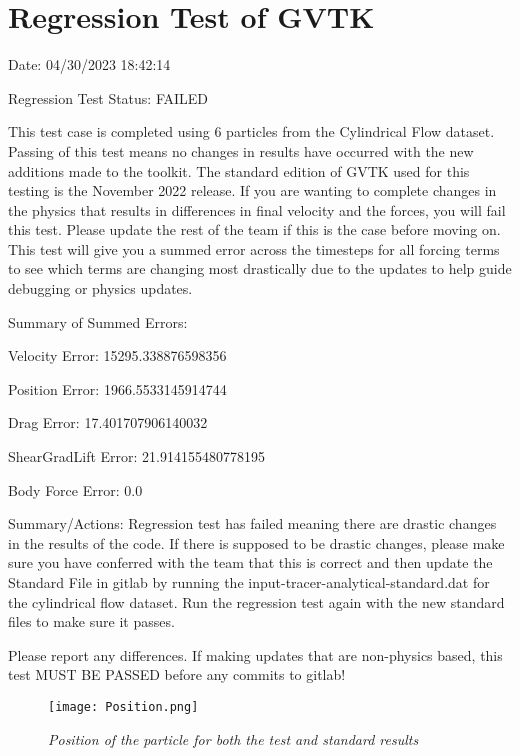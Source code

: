 \documentclass{article}
\begin{document}
\section{Regression Test of GVTK}
Date: 04/30/2023 18:42:14

\vspace{5pt}

\noindent Regression Test Status: FAILED

\vspace{5pt}

\noindent This test case is completed using 6 particles from the Cylindrical Flow dataset. Passing of this test means no changes in results have occurred with the new additions made to the toolkit.
The standard edition of GVTK used for this testing is the November 2022 release. If you are wanting to complete changes in the physics that results in differences in final velocity and the forces,
you will fail this test. Please update the rest of the team if this is the case before moving on. This test will give you a summed error across the timesteps for all forcing terms to see which terms
are changing most drastically due to the updates to help guide debugging or physics updates.



\vspace{5pt}

\noindent Summary of Summed Errors:
\vspace{5pt}

Velocity Error: 15295.338876598356

Position Error: 1966.5533145914744

Drag Error: 17.401707906140032

ShearGradLift Error: 21.914155480778195

Body Force Error: 0.0

\vspace{5pt}

\noindent Summary/Actions: Regression test has failed meaning there are drastic changes in the results of the code. 
If there is supposed to be drastic changes, please make sure you have conferred with the team that this is correct and then update the Standard File in gitlab by running the input-tracer-analytical-standard.dat for the cylindrical flow dataset.
Run the regression test again with the new standard files to make sure it passes.

\vspace{5pt}

\noindent Please report any differences. If making updates that are non-physics based, this test MUST BE PASSED before any commits to gitlab!

\begin{figure}[htbp]
\centering
\texttt{[image: Position.png]}
\caption{\textit{Position of the particle for both the test and standard results}}
\label{fig:postion}
\end{figure}
\end{document}
